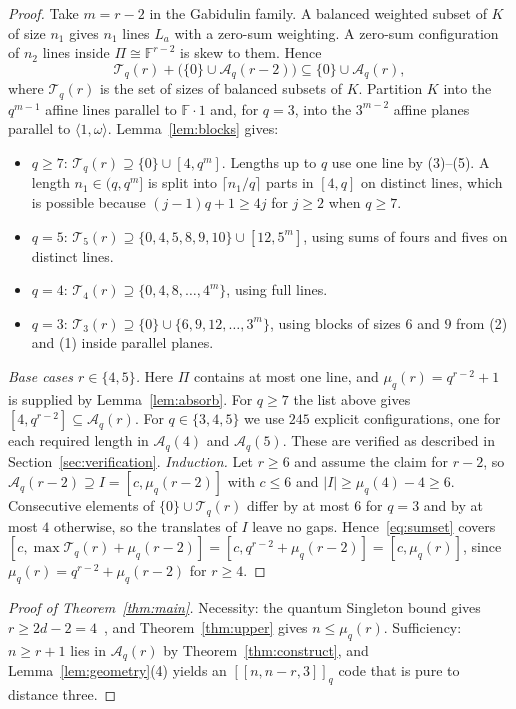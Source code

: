 \documentclass[11pt]{amsart}
\theoremstyle{definition}
\theoremstyle{remark}
\newcommand{\F}{\mathbb F}
\newcommand{\qq}[1]{[\![#1]\!]}
\begin{document}
\begin{proof}
Take $m=r-2$ in the Gabidulin family. A balanced weighted subset of $K$ of size $n_1$ gives $n_1$ lines $L_a$ with a zero-sum weighting. A zero-sum configuration of $n_2$ lines inside $\Pi\cong\F^{r-2}$ is skew to them. Hence
\begin{equation}\label{eq:sumset}
\mathcal T_q(r)+\bigl(\{0\}\cup\mathcal A_q(r-2)\bigr)\subseteq\{0\}\cup\mathcal A_q(r),
\end{equation}
where $\mathcal T_q(r)$ is the set of sizes of balanced subsets of $K$. Partition $K$ into the $q^{m-1}$ affine lines parallel to $\F\cdot1$ and, for $q=3$, into the $3^{m-2}$ affine planes parallel to $\langle1,\omega\rangle$. Lemma~\ref{lem:blocks} gives:
\begin{itemize}
\item $q\ge7$: $\mathcal T_q(r)\supseteq\{0\}\cup[4,q^m]$. Lengths up to $q$ use one line by (3)--(5). A length $n_1\in(q,q^m]$ is split into $\lceil n_1/q\rceil$ parts in $[4,q]$ on distinct lines, which is possible because $(j-1)q+1\ge4j$ for $j\ge2$ when $q\ge7$.
\item $q=5$: $\mathcal T_5(r)\supseteq\{0,4,5,8,9,10\}\cup[12,5^m]$, using sums of fours and fives on distinct lines.
\item $q=4$: $\mathcal T_4(r)\supseteq\{0,4,8,\dots,4^m\}$, using full lines.
\item $q=3$: $\mathcal T_3(r)\supseteq\{0\}\cup\{6,9,12,\dots,3^m\}$, using blocks of sizes $6$ and $9$ from (2) and (1) inside parallel planes.
\end{itemize}
\emph{Base cases $r\in\{4,5\}$.} Here $\Pi$ contains at most one line, and $\mu_q(r)=q^{r-2}+1$ is supplied by Lemma~\ref{lem:absorb}. For $q\ge7$ the list above gives $[4,q^{r-2}]\subseteq\mathcal A_q(r)$. For $q\in\{3,4,5\}$ we use $245$ explicit configurations, one for each required length in $\mathcal A_q(4)$ and $\mathcal A_q(5)$. These are verified as described in Section~\ref{sec:verification}.
\emph{Induction.} Let $r\ge6$ and assume the claim for $r-2$, so $\mathcal A_q(r-2)\supseteq I=[c,\mu_q(r-2)]$ with $c\le6$ and $|I|\ge\mu_q(4)-4\ge6$. Consecutive elements of $\{0\}\cup\mathcal T_q(r)$ differ by at most $6$ for $q=3$ and by at most $4$ otherwise, so the translates of $I$ leave no gaps. Hence~\eqref{eq:sumset} covers $[c,\max\mathcal T_q(r)+\mu_q(r-2)]=[c,q^{r-2}+\mu_q(r-2)]=[c,\mu_q(r)]$, since $\mu_q(r)=q^{r-2}+\mu_q(r-2)$ for $r\ge4$.
\end{proof}

\begin{proof}[Proof of Theorem~\ref{thm:main}]
Necessity: the quantum Singleton bound gives $r\ge 2d-2=4$~\cite{Rains1999,KKKS2006}, and Theorem~\ref{thm:upper} gives $n\le\mu_q(r)$. Sufficiency: $n\ge r+1$ lies in $\mathcal A_q(r)$ by Theorem~\ref{thm:construct}, and Lemma~\ref{lem:geometry}(4) yields an $\qq{n,n-r,3}_q$ code that is pure to distance three.
\end{proof}
\end{document}
